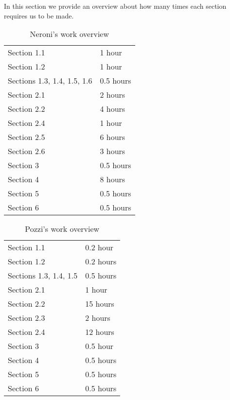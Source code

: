 In this section we provide an overview about how many times each section requires us to be made.


\begin{table} [H]
\centering
{}
{\centering
\begin{tabular}{m{2.5in}|m{.9in}}
Section 1.1 & 1 hour\\
Section 1.2 & 1 hour\\
Sections 1.3, 1.4, 1.5, 1.6 & 0.5 hours\\
Section 2.1 & 2 hours\\
Section 2.2 & 4 hours\\
Section 2.4 & 1 hour\\
Section 2.5 & 6 hours\\
Section 2.6 & 3 hours\\
Section 3 & 0.5 hours\\
Section 4 & 8 hours\\
Section 5 & 0.5 hours\\
Section 6 & 0.5 hours\\
\end{tabular}
}
\caption{Neroni's work overview}
\end{table}


\begin{table} [H]
\centering
{}
{\centering
\begin{tabular}{m{2.5in}|m{.9in}}
Section 1.1 & 0.2 hour\\
Section 1.2 & 0.2 hours\\
Sections 1.3, 1.4, 1.5 & 0.5 hours\\
Section 2.1 & 1 hour\\
Section 2.2 & 15 hours\\
Section 2.3 & 2 hours\\
Section 2.4 & 12 hours\\
Section 3 & 0.5 hour\\
Section 4 & 0.5 hours\\
Section 5 & 0.5 hours\\
Section 6 & 0.5 hours\\
\end{tabular}
}
\caption{Pozzi's work overview}
\end{table}



